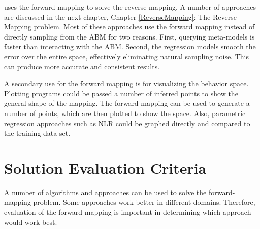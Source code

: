 \fw uses the forward mapping to solve the reverse mapping.
A number of approaches are discussed in the next chapter, Chapter \ref{ReverseMapping}: The Reverse-Mapping problem.
Most of these approaches use the forward mapping instead of directly sampling from the ABM for two reasons.
First, querying meta-models is faster than interacting with the ABM.
Second, the regression models smooth the error over the entire space, effectively eliminating natural sampling noise.
This can produce more accurate and consistent results.

A secondary use for the forward mapping is for visualizing the behavior space.
Plotting programs could be passed a number of inferred points to show the general shape of the mapping.
The forward mapping can be used to generate a number of points, which are then plotted to show the space.
Also, parametric regression approaches such as NLR could be graphed directly and compared to the training data set.



\section{Solution Evaluation Criteria}
\label{sec:soln_eval}
A number of algorithms and approaches can be used to solve the forward-mapping problem.
Some approaches work better in different domains.
Therefore, evaluation of the forward mapping is important in determining which approach would work best.

